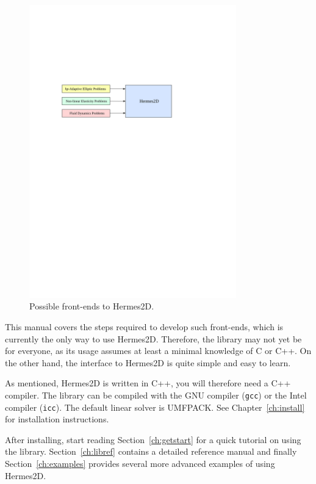\begin{figure}[ht]
  \centering
  \medskip
  \includegraphics[width=0.8\textwidth]{img/frontends}
  \caption{Possible front-ends to Hermes2D.}
  \label{fig:frontends}
\end{figure}

This manual covers the steps required to develop such front-ends, which is currently
the only way to use Hermes2D. Therefore, the library may not yet be for everyone, as
its usage assumes at least a minimal knowledge of C or C++. On the other hand, the
interface to Hermes2D is quite simple and easy to learn.

As mentioned, Hermes2D is written in C++, you will therefore need a C++ compiler. The
library can be compiled with the GNU compiler ({\tt gcc}) or the Intel compiler
({\tt icc}). The default linear solver is UMFPACK. See Chapter~\ref{ch:install} for
installation instructions.

After installing, start reading Section~\ref{ch:getstart} for a quick tutorial on
using the library. Section~\ref{ch:libref} contains a detailed reference
manual and finally Section~\ref{ch:examples} provides several more advanced examples
of using Hermes2D.
